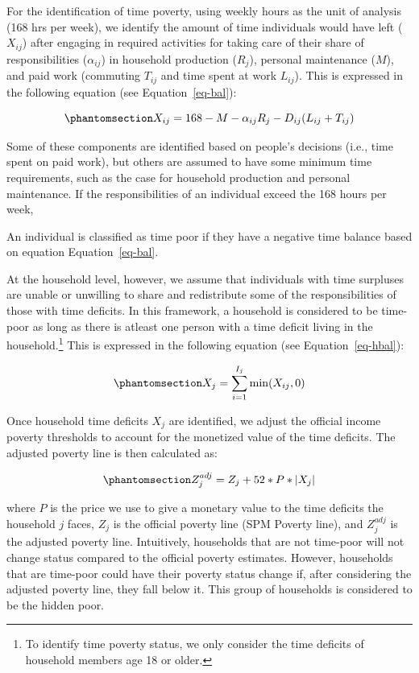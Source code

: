 \documentclass[
  11pt,
]{article}
\begin{document}
For the identification of time poverty, using weekly hours as the unit
of analysis (168 hrs per week), we identify the amount of time
individuals would have left (\(X_{ij}\)) after engaging in required
activities for taking care of their share of responsibilities
(\(\alpha_{ij}\)) in household production (\(R_j\)), personal
maintenance (\(M\)), and paid work (commuting \(T_{ij}\) and time spent
at work \(L_{ij}\)). This is expressed in the following equation (see
Equation~\ref{eq-bal}):

\begin{equation}\phantomsection\label{eq-bal}{X_{ij} = 168 - M - \alpha_{ij}R_j-D_{ij}(L_{ij}+T_{ij})
}\end{equation}

Some of these components are identified based on people's decisions
(i.e., time spent on paid work), but others are assumed to have some
minimum time requirements, such as the case for household production and
personal maintenance. If the responsibilities of an individual exceed
the 168 hours per week,

An individual is classified as time poor if they have a negative time
balance based on equation Equation~\ref{eq-bal}.

At the household level, however, we assume that individuals with time
surpluses are unable or unwilling to share and redistribute some of the
responsibilities of those with time deficits. In this framework, a
household is considered to be time-poor as long as there is atleast one
person with a time deficit living in the household.\footnote{To identify
  time poverty status, we only consider the time deficits of household
  members age 18 or older.} This is expressed in the following equation
(see Equation~\ref{eq-hbal}):

\begin{equation}\phantomsection\label{eq-hbal}{X_{j} = \sum_{i=1}^{I_j} \min(X_{ij},0)
}\end{equation}

Once household time deficits \(X_{j}\) are identified, we adjust the
official income poverty thresholds to account for the monetized value of
the time deficits. The adjusted poverty line is then calculated as:

\begin{equation}\phantomsection\label{eq-limtip}{Z_{j}^{adj} = Z_{j} + 52*P* |X_{j}|
}\end{equation}

where \(P\) is the price we use to give a monetary value to the time
deficits the household \({j}\) faces, \(Z_{j}\) is the official poverty
line (SPM Poverty line), and \(Z_{j}^{adj}\) is the adjusted poverty
line. Intuitively, households that are not time-poor will not change
status compared to the official poverty estimates. However, households
that are time-poor could have their poverty status change if, after
considering the adjusted poverty line, they fall below it. This group of
households is considered to be the hidden poor.
\end{document}
